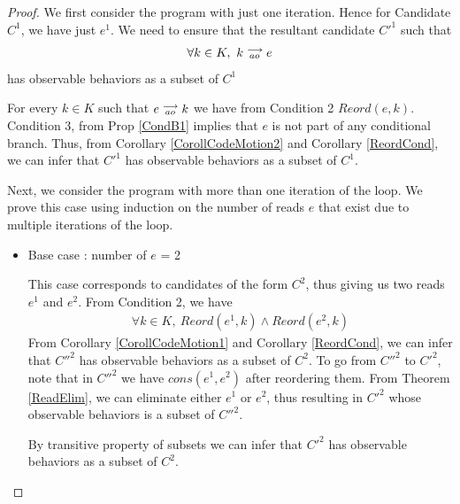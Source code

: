             \begin{proof}

                We first consider the program with just one iteration. Hence for Candidate $C^1$, we have just $e^1$. 
                We need to ensure that the resultant candidate $C'^1$ such that 
                \begin{align*}
                    \forall k \in K, \ k\stackrel{\longrightarrow}{_{ao}}e
                \end{align*}  
                has observable behaviors as a subset of $C^1$

                For every $k \in K$ such that $e\stackrel{\longrightarrow}{_{ao}}k$ we have from Condition 2 $Reord(e,k)$. 
                Condition 3, from Prop \ref{CondB1} implies that $e$ is not part of any conditional branch.
                Thus, from Corollary \ref{CorollCodeMotion2} and Corollary \ref{ReordCond}, we can infer that $C'^1$ has observable behaviors as a subset of $C^1$. 
                
                Next, we consider the program with more than one iteration of the loop. 
                We prove this case using induction on the number of reads $e$ that exist due to multiple iterations of the loop. 

                \begin{itemize}
                    
                    \item Base case : number of $e$ = 2
                
                    This case corresponds to candidates of the form $C^2$, thus giving us two reads $e^1$ and $e^2$.
                    From Condition 2, we have
                    \begin{align*}
                        \forall k \in K, \ Reord(e^1, k) \wedge Reord(e^2, k)
                    \end{align*} 
                    From Corollary \ref{CorollCodeMotion1} and Corollary \ref{ReordCond}, we can infer that $C''^2$ has observable behaviors as a subset of $C^2$.
                    To go from $C''^2$ to $C'^2$, note that in $C''^2$ we have $cons(e^1, e^2)$ after reordering them. 
                    From Theorem \ref{ReadElim}, we can eliminate either $e^1$ or $e^2$, thus resulting in $C'^2$ whose observable behaviors is a subset of $C''^2$.
                    
                    By transitive property of subsets we can infer that $C'^2$ has observable behaviors as a subset of $C^2$.
                    

\end{itemize}
\end{proof}

